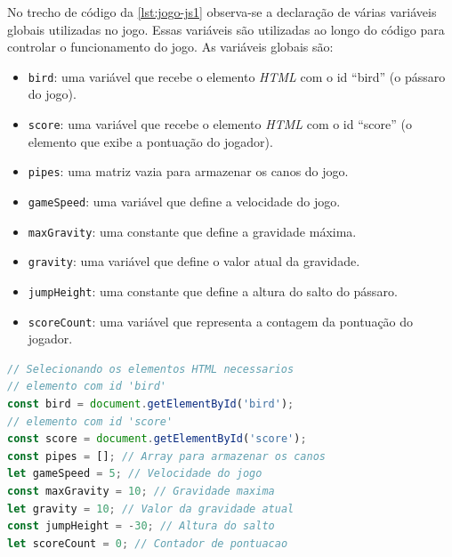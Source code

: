 No trecho de código da \autoref{lst:jogo-js1} observa-se a declaração de várias variáveis globais utilizadas no jogo. Essas variáveis são utilizadas ao longo do código para controlar o funcionamento do jogo. As variáveis globais são:
\begin{itemize}
    \item \texttt{bird}: uma variável que recebe o elemento \textit{HTML} com o id ``bird'' (o pássaro do jogo).

    \item \texttt{score}: uma variável que recebe o elemento \textit{HTML} com o id ``score'' (o elemento que exibe a pontuação do jogador).

    \item \texttt{pipes}: uma matriz vazia para armazenar os canos do jogo.
    
    \item \texttt{gameSpeed}: uma variável que define a velocidade do jogo.
    
    \item \texttt{maxGravity}: uma constante que define a gravidade máxima.
    
    \item \texttt{gravity}: uma variável que define o valor atual da gravidade.
    
    \item \texttt{jumpHeight}: uma constante que define a altura do salto do pássaro.
    
    \item \texttt{scoreCount}: uma variável que representa a contagem da pontuação do jogador.
    
\end{itemize}



\begin{lstlisting}[language=TypeScript, caption={Projeto exemplo em JS (Parte 1): Declaração de variáveis globais}, label=lst:jogo-js1]
// Selecionando os elementos HTML necessarios
// elemento com id 'bird'
const bird = document.getElementById('bird'); 
// elemento com id 'score'
const score = document.getElementById('score'); 
const pipes = []; // Array para armazenar os canos
let gameSpeed = 5; // Velocidade do jogo
const maxGravity = 10; // Gravidade maxima
let gravity = 10; // Valor da gravidade atual
const jumpHeight = -30; // Altura do salto
let scoreCount = 0; // Contador de pontuacao
\end{lstlisting}


